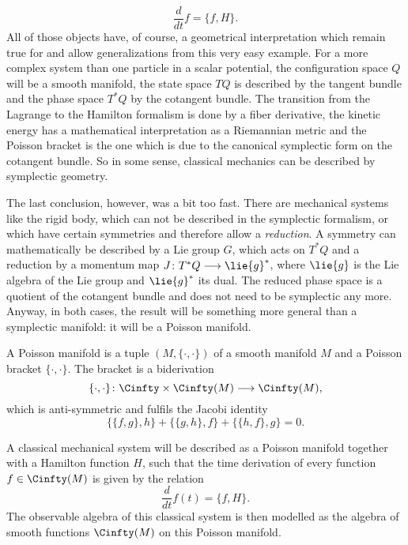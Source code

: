 \begin{equation*}
	\frac{d}{dt} f
	=
	\{ f, H \}.
\end{equation*}
All of those objects have, of course, a geometrical interpretation which remain 
true for and allow generalizations from this very easy example. For a more 
complex system than one particle in a scalar potential, the configuration space 
$Q$ will be a smooth manifold, the state space $TQ$ is described by the tangent 
bundle and the phase space $T^*Q$ by the cotangent bundle. The transition from 
the Lagrange to the Hamilton formalism is done by a fiber derivative, the 
kinetic energy has a mathematical interpretation as a Riemannian metric and the 
Poisson bracket is the one which is due to the canonical symplectic form on the 
cotangent bundle. So in some sense, classical mechanics can be described by 
symplectic geometry.


The last conclusion, however, was a bit too fast. There are mechanical systems 
like the rigid body, which can not be described in the symplectic formalism, 
or which have certain symmetries and therefore allow a \emph{reduction}. A 
symmetry can mathematically be described by a Lie group $G$, which acts on 
$T^*Q$ and a reduction by a momentum map $J \colon T^*Q \longrightarrow 
\lie{g}^*$, where $\lie{g}$ is the Lie algebra of the Lie group and $\lie{g}^*$ 
its dual. The reduced phase space is a quotient of the cotangent bundle and 
does not need to be symplectic any more. Anyway, in both cases, the result will 
be something more general than a symplectic manifold: it will be a Poisson 
manifold. 
\begin{definition}
	A Poisson manifold is a tuple $(M, \{ \cdot, \cdot \})$ of a smooth 
	manifold $M$ and a Poisson bracket $\{ \cdot, \cdot\}$. The bracket is a 
	biderivation
	\begin{equation*}
		\{ \cdot, \cdot \}
		\colon
		\Cinfty
		\times
		\Cinfty(M)
		\longrightarrow
		\Cinfty(M),
	\end{equation*}
	which is anti-symmetric and fulfils the Jacobi identity
	\begin{equation*}
		\{ \{f, g\}, h \}
		+
		\{ \{g, h\}, f \}
		+
		\{ \{h, f\}, g \}
		=
		0.
	\end{equation*}
\end{definition}
A classical mechanical system will be described as a Poisson manifold together 
with a Hamilton function $H$, such that the time derivation of every function 
$f \in \Cinfty(M)$ is given by the relation
\begin{equation*}
	\frac{d}{dt} f(t)
	=
	\{f, H\}.
\end{equation*}
The observable algebra of this classical system is then modelled as the algebra 
of smooth functions $\Cinfty(M)$ on this Poisson manifold.



